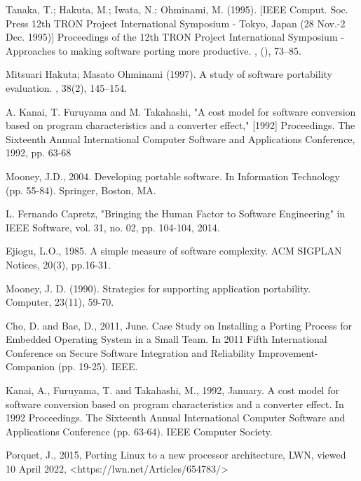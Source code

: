 \begin{flushleft}
    \begin{thebibliography}{99}

    Tanaka, T.; Hakuta, M.; Iwata, N.; Ohminami, M. (1995).
    [IEEE Comput. Soc. Press 12th TRON Project International Symposium - Tokyo, Japan (28 Nov.-2 Dec. 1995)]
    Proceedings of the 12th TRON Project International Symposium - Approaches to making software porting more productive. , (), 73–85.

    Mitsuari Hakuta; Masato Ohminami (1997).
    A study of software portability evaluation. , 38(2), 145–154.

    A. Kanai, T. Furuyama and M. Takahashi,
    "A cost model for software conversion based on program characteristics and a converter effect,"
    [1992] Proceedings. The Sixteenth Annual International Computer Software and Applications Conference, 1992, pp. 63-68

    Mooney, J.D., 2004.
    Developing portable software.
    In Information Technology (pp. 55-84). Springer, Boston, MA.

    L. Fernando Capretz,
    "Bringing the Human Factor to Software Engineering"
    in IEEE Software, vol. 31, no. 02, pp. 104-104, 2014.

    Ejiogu, L.O., 1985.
    A simple measure of software complexity.
    ACM SIGPLAN Notices, 20(3), pp.16-31.

    Mooney, J. D. (1990).
    Strategies for supporting application portability.
    Computer, 23(11), 59-70.

    Cho, D. and Bae, D., 2011, June.
    Case Study on Installing a Porting Process for Embedded Operating System in a Small Team.
    In 2011 Fifth International Conference on Secure Software Integration and Reliability Improvement-Companion (pp. 19-25). IEEE.

    Kanai, A., Furuyama, T. and Takahashi, M., 1992, January.
    A cost model for software conversion based on program characteristics and a converter effect.
    In 1992 Proceedings. The Sixteenth Annual International Computer Software and Applications Conference (pp. 63-64). IEEE Computer Society.

    Porquet, J., 2015,
    Porting Linux to a new processor architecture,
    LWN,
    viewed 10 April 2022,
    <https://lwn.net/Articles/654783/>


\end{thebibliography}
\end{flushleft}
